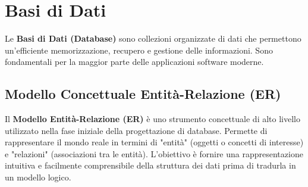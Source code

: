 \chapter{Basi di Dati}

Le \textbf{Basi di Dati (Database)} sono collezioni organizzate di dati che permettono un'efficiente memorizzazione, recupero e gestione delle informazioni. Sono fondamentali per la maggior parte delle applicazioni software moderne.

\section{Modello Concettuale Entità-Relazione (ER)}
Il \textbf{Modello Entità-Relazione (ER)} è uno strumento concettuale di alto livello utilizzato nella fase iniziale della progettazione di database. Permette di rappresentare il mondo reale in termini di "entità" (oggetti o concetti di interesse) e "relazioni" (associazioni tra le entità). L'obiettivo è fornire una rappresentazione intuitiva e facilmente comprensibile della struttura dei dati prima di tradurla in un modello logico.

